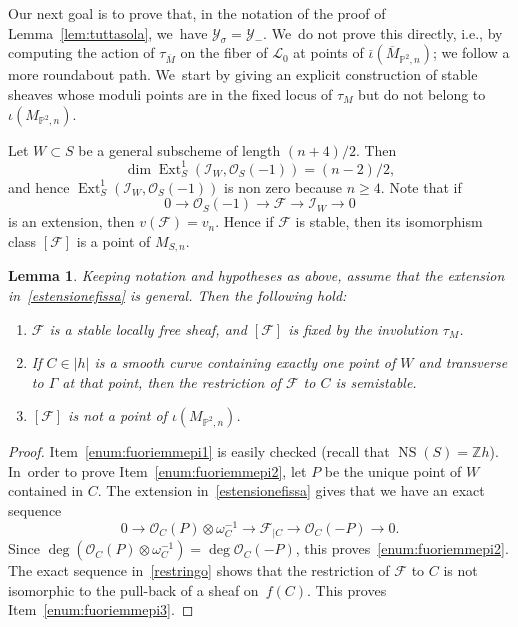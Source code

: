 \documentclass[11pt]{article}
\newcommand{\ie}{i.e.,\xspace}
\newenvironment{enumeratea}
{\bgroup\def\theenumi{\alph{enumi}}\begin{enumerate}}
{\end{enumerate}\egroup}
\newcommand{\PP}{{\mathbb P}}\let\P\PP
\newcommand{\ZZ}{{\mathbb Z}}\let\Z\ZZ
\newcommand\cF{\mathcal{F}}
\newcommand\cI{\mathcal{I}}
\newcommand\cL{\mathcal{L}}
\newcommand\cO{\mathcal{O}}
\newcommand\cY{\mathcal{Y}}
\DeclareMathOperator{\Ext}{Ext}
\DeclareMathOperator{\NS}{NS}
\let\ov\overline
\newtheorem{lemm}{Lemma}[section]
\theoremstyle{definition}
\begin{document}
Our next goal is to prove that, in the notation of the proof of Lemma~\ref{lem:tuttasola}, we~have $\cY_{\sigma}=\cY_{-}$. We~do not prove this directly, \ie by computing the action of $\tau_{\ov{M}}$ on the fiber of $\cL_0$ at points of $\ov{\iota}(\ov{M}_{\PP^2,n})$; we follow a more roundabout path. We~start by giving an explicit construction of stable sheaves whose moduli points are in the fixed locus of $\tau_M$ but do not belong to $\iota(M_{\PP^2,n})$.

Let $W\subset S$ be a general subscheme of length $(n+4)/2$. Then
\begin{equation*}\label{dimext}
\dim\Ext^1_S(\cI_W,\cO_S(-1))=(n-2)/2,
\end{equation*}
and hence
$\Ext^1_S(\cI_W,\cO_S(-1))$ is non zero because $n\ge 4$. Note that if
\begin{equation}\label{estensionefissa}
0\to \cO_S(-1)\to \cF\to \cI_W\to 0
\end{equation}
is an extension, then $v(\cF)=v_n$.
Hence if $\cF$ is stable, then its isomorphism class $[\cF]$ is a point of $M_{S,n}$.

\begin{lemm}\label{lem:fuoriemmepi}
Keeping notation and hypotheses as above, assume that the extension in~\eqref{estensionefissa} is general.
Then the following hold:
\begin{enumeratea}
\item\label{enum:fuoriemmepi1} $\cF$ is a stable locally free sheaf, and $[\cF]$ is fixed by the involution $\tau_{M}$.
\item\label{enum:fuoriemmepi2} If $C\in|h|$ is a smooth curve containing exactly one point of $W$ and transverse to $\mathsf{\Gamma}$ at that point, then the restriction of $\cF$ to $C$ is semistable.
\item\label{enum:fuoriemmepi3} $[\cF]$ is not a point of $\iota(M_{\PP^2,n})$.
\end{enumeratea}
\end{lemm}

\begin{proof}
Item~\eqref{enum:fuoriemmepi1} is easily checked (recall that $\NS(S)=\ZZ h$). In~order to prove Item~\eqref{enum:fuoriemmepi2}, let $P$ be the unique point of $W$ contained in $C$.
The extension in~\eqref{estensionefissa} gives that we have an exact sequence
\begin{equation}\label{restringo}
0\to \cO_C(P)\otimes\omega^{-1}_C\to \cF_{|C}\to \cO_C(-P)\to 0.
\end{equation}
Since $\deg(\cO_C(P)\otimes\omega^{-1}_C)=\deg\cO_C(-P)$, this proves~\eqref{enum:fuoriemmepi2}.
The exact sequence in~\eqref{restringo} shows that the restriction of $\cF$ to $C$ is not isomorphic to the pull-back of a sheaf on~$f(C)$. This proves Item~\eqref{enum:fuoriemmepi3}.
\end{proof}
\end{document}
